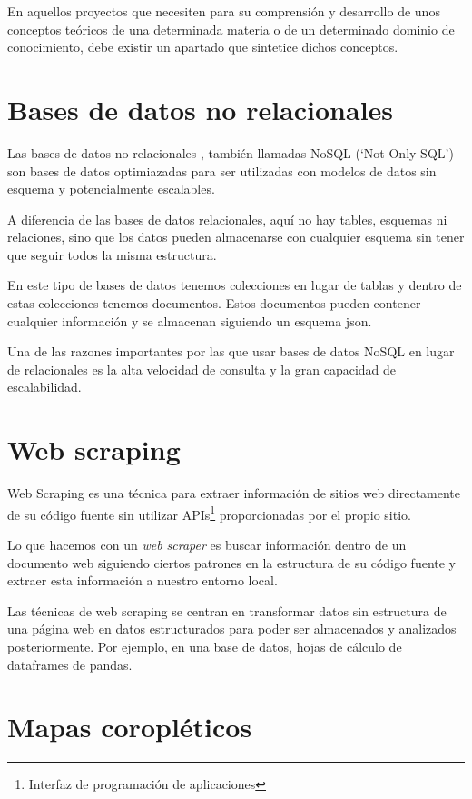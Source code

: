 
En aquellos proyectos que necesiten para su comprensión y desarrollo de unos conceptos teóricos de una determinada materia o de un determinado dominio de conocimiento, debe existir un apartado que sintetice dichos conceptos.


\section{Bases de datos no relacionales}

Las bases de datos no relacionales \cite{wiki:nosql}, también llamadas NoSQL (`Not Only SQL') son bases de datos optimiazadas para ser utilizadas con modelos de datos sin esquema y potencialmente escalables.

A diferencia de las bases de datos relacionales, aquí no hay tables, esquemas ni relaciones, sino que los datos pueden almacenarse con cualquier esquema sin tener que seguir todos la misma estructura.

En este tipo de bases de datos tenemos colecciones en lugar de tablas y dentro de estas colecciones tenemos documentos. Estos documentos pueden contener cualquier información y se almacenan siguiendo un esquema json.

Una de las razones importantes por las que usar bases de datos NoSQL en lugar de relacionales es la alta velocidad de consulta y la gran capacidad de escalabilidad.


\section{Web scraping} \label{webscraping}

Web Scraping \cite{wiki:webscraping} es una técnica para extraer información de sitios web directamente de su código fuente sin utilizar APIs\footnote{Interfaz de programación de aplicaciones} proporcionadas por el propio sitio.

Lo que hacemos con un \textit{web scraper} es buscar información dentro de un documento web siguiendo ciertos patrones en la estructura de su código fuente y extraer esta información a nuestro entorno local.

Las técnicas de web scraping se centran en transformar datos sin estructura de una página web en datos estructurados para poder ser almacenados y analizados posteriormente. Por ejemplo, en una base de datos, hojas de cálculo de dataframes de pandas.

\section{Mapas coropléticos} \label{mapascoropleticos}

